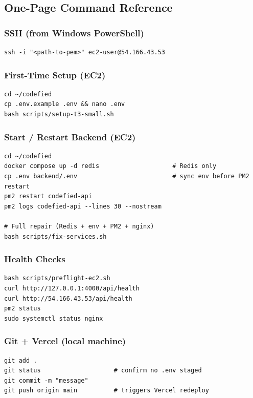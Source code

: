 \documentclass[11pt,a4paper]{article}
\begin{document}
\subsection{One-Page Command Reference}

\subsubsection{SSH (from Windows PowerShell)}
\begin{lstlisting}[style=terminal]
ssh -i "<path-to-pem>" ec2-user@54.166.43.53
\end{lstlisting}

\subsubsection{First-Time Setup (EC2)}
\begin{lstlisting}[style=terminal]
cd ~/codefied
cp .env.example .env && nano .env
bash scripts/setup-t3-small.sh
\end{lstlisting}

\subsubsection{Start / Restart Backend (EC2)}
\begin{lstlisting}[style=terminal]
cd ~/codefied
docker compose up -d redis                    # Redis only
cp .env backend/.env                          # sync env before PM2 restart
pm2 restart codefied-api
pm2 logs codefied-api --lines 30 --nostream

# Full repair (Redis + env + PM2 + nginx)
bash scripts/fix-services.sh
\end{lstlisting}

\subsubsection{Health Checks}
\begin{lstlisting}[style=terminal]
bash scripts/preflight-ec2.sh
curl http://127.0.0.1:4000/api/health
curl http://54.166.43.53/api/health
pm2 status
sudo systemctl status nginx
\end{lstlisting}

\subsubsection{Git + Vercel (local machine)}
\begin{lstlisting}[style=terminal]
git add .
git status                    # confirm no .env staged
git commit -m "message"
git push origin main          # triggers Vercel redeploy
\end{lstlisting}
\end{document}
